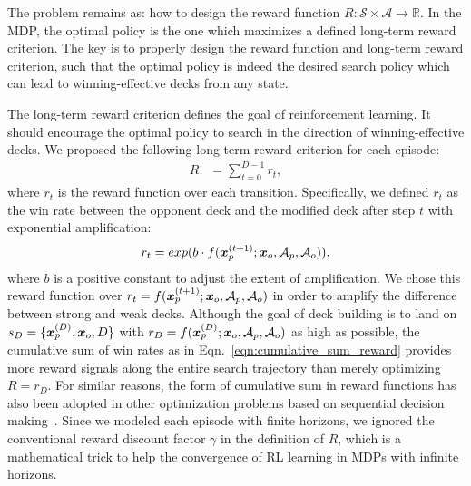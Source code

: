 

The problem remains as: how to design the reward function $R: \mathcal{S} \times \mathcal{A} \rightarrow \mathbb{R}$. In the MDP, the optimal policy is the one which maximizes a defined long-term reward criterion. The  key is to properly design the reward function and long-term reward criterion, such that the optimal policy is indeed the desired search policy which can lead to winning-effective decks from any state. 

The long-term reward criterion defines the goal of reinforcement learning. It should encourage the optimal policy to search in the direction of winning-effective decks. We proposed the following long-term reward criterion for each episode:
\begin{align}
R &=\sum_{t=0}^{D-1} r_t,
\label{eqn:cumulative_sum_reward}
\end{align}
where $r_t$ is the reward function over each transition. Specifically, we defined $r_t$ as the win rate between the opponent deck and the modified deck after step $t$ with exponential amplification:
\begin{align}
    r_t=exp(b \cdot f(\boldsymbol{x}^{(t+1)}_p; \boldsymbol{x}_o, \mathcal{A}_p, \mathcal{A}_o)),
\end{align}
where $b$ is a positive constant to adjust the extent of amplification. We chose this reward function over $r_t=f(\boldsymbol{x}^{(t+1)}_p; \boldsymbol{x}_o, \mathcal{A}_p, \mathcal{A}_o)$ in order to amplify the difference between strong and weak decks. Although the goal of deck building is to land on ${s_D=\{\boldsymbol{x}_p^{(D)}, \boldsymbol{x}_o, D\}}$ with $r_D=f(\boldsymbol{x}_p^{(D)}; \boldsymbol{x}_o, \mathcal{A}_p, \mathcal{A}_o)$ as high as possible, the cumulative sum of win rates as in Eqn.~\ref{eqn:cumulative_sum_reward} provides more reward signals along the entire search trajectory than merely optimizing ${R=r_D}$. For similar reasons, the form of cumulative sum in reward functions has also been adopted in other optimization problems based on sequential decision making~\citep{andrychowicz2016learning,chenlearning}. Since we modeled each episode with finite horizons, we ignored the conventional reward discount factor $\gamma$ in the definition of $R$, which is a mathematical trick to help the convergence of RL learning in MDPs with infinite horizons. 

